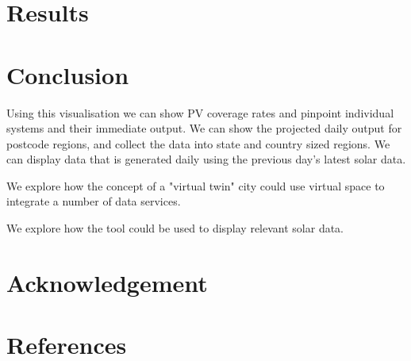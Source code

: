 \documentclass[10pt, a4paper]{article}
\begin{document}
\begin{multicols}{2}
\section{Results}


\section{Conclusion}

Using this visualisation we can show PV coverage rates and pinpoint individual systems and their immediate output. We can show the projected daily output for postcode regions, and collect the data into state and country sized regions. We can display data that is generated daily using the previous day's latest solar data. 

We explore how the concept of a "virtual twin" city could use virtual space to integrate a number of data services.

We explore how the tool could be used to display relevant solar data.


\section*{Acknowledgement}

\section*{References}



\end{multicols}
\end{document}
